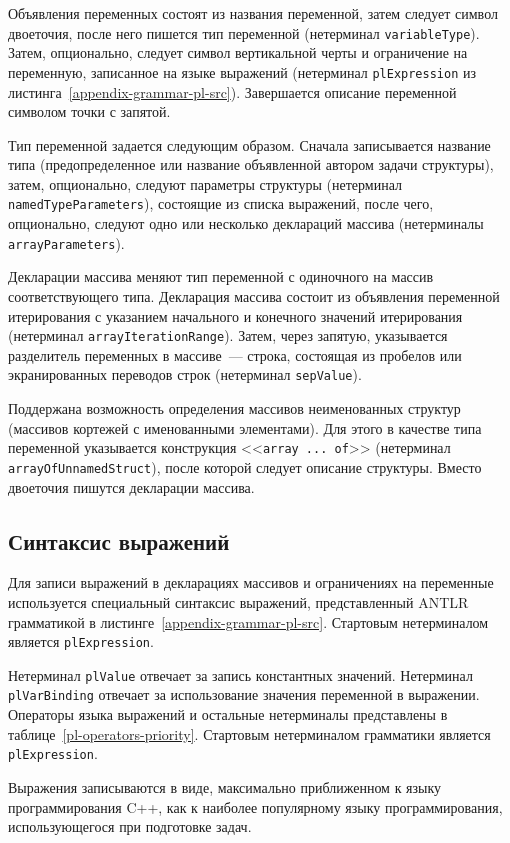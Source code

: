 \documentclass[times,specification,annotation]{style/itmo-student-thesis/itmo-student-thesis}
\begin{document}
Объявления переменных состоят из названия переменной, затем следует символ двоеточия, после него пишется тип переменной (нетерминал \texttt{variableType}). Затем, опционально, следует символ вертикальной черты и ограничение на переменную, записанное на языке выражений (нетерминал \texttt{plExpression} из листинга~\ref{appendix-grammar-pl-src}). Завершается описание переменной символом точки с запятой.

Тип переменной задается следующим образом. Сначала записывается название типа (предопределенное или название объявленной автором задачи структуры), затем, опционально, следуют параметры структуры (нетерминал \texttt{namedTypeParameters}), состоящие из списка выражений, после чего, опционально, следуют одно или несколько деклараций массива (нетерминалы \texttt{arrayParameters}).

Декларации массива меняют тип переменной с одиночного на массив соответствующего типа. Декларация массива состоит из объявления переменной итерирования с указанием начального и конечного значений итерирования (нетерминал \texttt{arrayIterationRange}). Затем, через запятую, указывается разделитель переменных в массиве~--- строка, состоящая из пробелов или экранированных переводов строк (нетерминал \texttt{sepValue}).

Поддержана возможность определения массивов неименованных структур (массивов кортежей с именованными элементами). Для этого в качестве типа переменной указывается конструкция <<\texttt{array ... of}>> (нетерминал \texttt{arrayOfUnnamedStruct}), после которой следует описание структуры. Вместо двоеточия пишутся декларации массива.

\subsection{Синтаксис выражений}

Для записи выражений в декларациях массивов и ограничениях на переменные используется специальный синтаксис выражений, представленный ANTLR грамматикой в листинге~\ref{appendix-grammar-pl-src}. Стартовым нетерминалом является \texttt{plExpression}.

Нетерминал \texttt{plValue} отвечает за запись константных значений. Нетерминал \texttt{plVarBinding} отвечает за использование значения переменной в выражении. Операторы языка выражений и остальные нетерминалы представлены в таблице~\ref{pl-operators-priority}. Стартовым нетерминалом грамматики является \texttt{plExpression}.

Выражения записываются в виде, максимально приближенном к языку программирования C++, как к наиболее популярному языку программирования, использующегося при подготовке задач.
\end{document}
